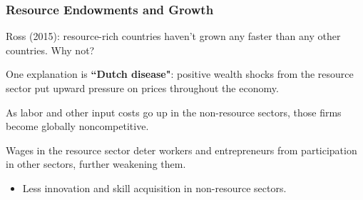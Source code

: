 \documentclass{beamer}
\begin{document}
\begin{frame} 
	\frametitle{\LARGE{Resource Endowments and Growth}}
	\begin{itemize}
		\large{
			\item Ross (2015): resource-rich countries haven't grown any faster than any other countries. Why not? \pause 
			\item One explanation is \textbf{``Dutch disease"}: positive wealth shocks from the resource sector put upward pressure on prices throughout the economy. \pause 
			\item As labor and other input costs go up in the non-resource sectors, those firms become globally noncompetitive.  \pause 
			\item Wages in the resource sector deter workers and entrepreneurs from participation in other sectors, further weakening them.  \pause 
			\begin{itemize}
				\item Less innovation and skill acquisition in non-resource sectors.
			\end{itemize}
		}
	\end{itemize}
\end{frame}

\end{document}

